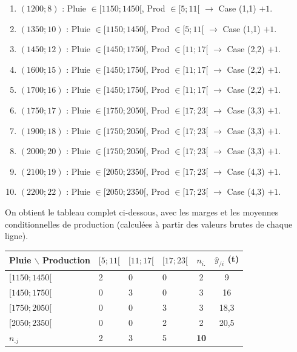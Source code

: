 \documentclass[11pt]{article}
\begin{document}
\begin{methode}
\begin{enumerate}
\item $(1200 ; 8)$ : Pluie $\in [1150 ; 1450[$, Prod $\in [5 ; 11[$ $\rightarrow$ Case (1,1) $+1$.
\item $(1350 ; 10)$ : Pluie $\in [1150 ; 1450[$, Prod $\in [5 ; 11[$ $\rightarrow$ Case (1,1) $+1$.
\item $(1450 ; 12)$ : Pluie $\in [1450 ; 1750[$, Prod $\in [11 ; 17[$ $\rightarrow$ Case (2,2) $+1$.
\item $(1600 ; 15)$ : Pluie $\in [1450 ; 1750[$, Prod $\in [11 ; 17[$ $\rightarrow$ Case (2,2) $+1$.
\item $(1700 ; 16)$ : Pluie $\in [1450 ; 1750[$, Prod $\in [11 ; 17[$ $\rightarrow$ Case (2,2) $+1$.
\item $(1750 ; 17)$ : Pluie $\in [1750 ; 2050[$, Prod $\in [17 ; 23[$ $\rightarrow$ Case (3,3) $+1$.
\item $(1900 ; 18)$ : Pluie $\in [1750 ; 2050[$, Prod $\in [17 ; 23[$ $\rightarrow$ Case (3,3) $+1$.
\item $(2000 ; 20)$ : Pluie $\in [1750 ; 2050[$, Prod $\in [17 ; 23[$ $\rightarrow$ Case (3,3) $+1$.
\item $(2100 ; 19)$ : Pluie $\in [2050 ; 2350[$, Prod $\in [17 ; 23[$ $\rightarrow$ Case (4,3) $+1$.
\item $(2200 ; 22)$ : Pluie $\in [2050 ; 2350[$, Prod $\in [17 ; 23[$ $\rightarrow$ Case (4,3) $+1$.
\end{enumerate}
\end{methode}

On obtient le tableau complet ci-dessous, avec les marges et les moyennes conditionnelles de production (calculées à partir des valeurs brutes de chaque ligne).

\begin{center}
\begin{tabularx}{\linewidth}{|l|X|X|X|c|c|}
\hline
\rowcolor{popblueL} Pluie $\backslash$ Production & $[5 ; 11[$ & $[11 ; 17[$ & $[17 ; 23[$ & $n_{i.}$ & $\bar{y}_{/i}$ (t) \\
\hline
$[1150 ; 1450[$ & 2 & 0 & 0 & 2 & 9 \\
\hline
$[1450 ; 1750[$ & 0 & 3 & 0 & 3 & 16 \\
\hline
$[1750 ; 2050[$ & 0 & 0 & 3 & 3 & 18{,}3 \\
\hline
$[2050 ; 2350[$ & 0 & 0 & 2 & 2 & 20{,}5 \\
\hline
\rowcolor{popgoldL} $n_{.j}$ & 2 & 3 & 5 & \textbf{10} & \\
\hline
\end{tabularx}
\end{center}
\end{document}
